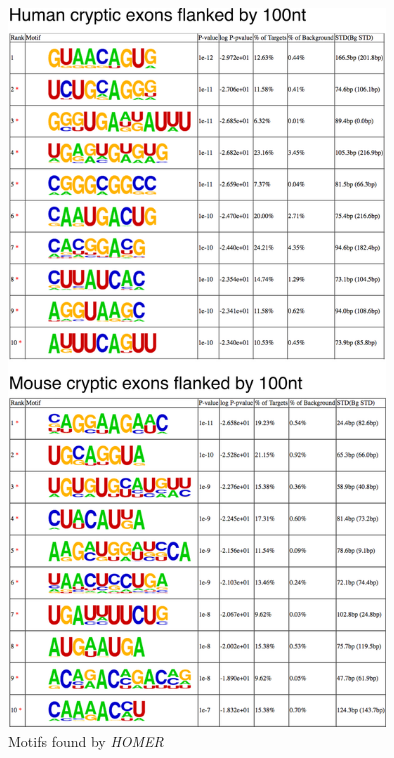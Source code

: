 \begin{appendices}
\begin{figure}
	\begin{center}
		\includegraphics[width=10cm]{Figures/03_cryptic_exons/Figure_S4_HOMER.png}
	\end{center}
	\caption{Motifs found by \textit{HOMER}}
\end{figure}

	\addtolength{\abovecaptionskip}{-25mm}


\begin{landscape}


\end{landscape}
\end{appendices}
